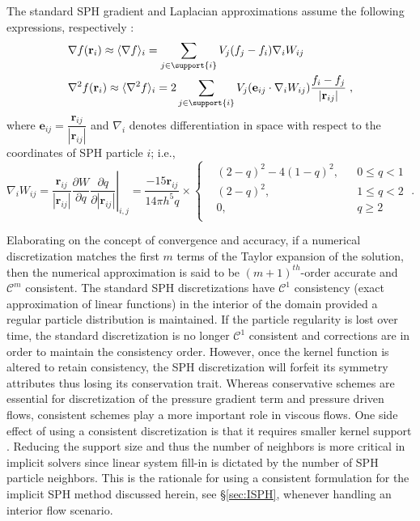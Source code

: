 The standard SPH gradient and Laplacian approximations assume the following expressions, respectively \cite{Monaghan2005a}:
\begin{align}
&\nabla f(\mathbf r_i) \approx \langle \nabla f \rangle_i=\sum_{j \in \support{i}} V_j (f_j-f_i) \nabla_i W_{ij}\label{eq:Standard_G}\\
&\nabla^2 f(\mathbf r_i) \approx \langle \nabla^2 f \rangle_i=2\sum_{j \in \support{i}} V_j ( \mathbf{e}_{ij} \cdot \nabla_i W_{ij}) \frac{f_i-f_j}{|\mathbf{r}_{ij}|} \; , \label{eq:Standard_L}
\end{align}
where $\mathbf{e}_{ij}=\dfrac{\mathbf{r}_{ij}}{|\mathbf{r}_{ij}|}$ and $\nabla_i$ denotes differentiation in space with respect to the coordinates of SPH particle $i$; i.e., 
\begin{equation}
\label{eq:nablaW}
\nabla_i W_{ij} =\left.\frac{\mathbf r_{ij}}{|\mathbf r_{ij}|} \frac{\partial W}{\partial q} \frac{\partial q}{\partial |\mathbf r_{ij}|}\right\vert_{i,j} =  \frac{-15{\mathbf r}_{ij}}{{14\pi {h^5}q}} \times \left\{ \begin{aligned}
&{(2 - q)^2} - 4{(1 - q)^2}, && 0 \le q < 1 \\ 
&(2 - q)^2, && 1 \le q < 2 \\ 
&0, && q \ge 2 \\ 
\end{aligned} \right.\; .
\end{equation}

Elaborating on the concept of convergence and accuracy, if a numerical discretization matches the first $m$ terms of the Taylor expansion of the solution, then the numerical approximation
is said to be $(m + 1)^{th}$-order accurate and $\mathcal{C}^m$ consistent. The standard SPH discretizations have $\mathcal{C}^1$  consistency (exact approximation of linear functions) in the interior of the domain provided a regular particle distribution is maintained. If the particle regularity is lost over time, the standard discretization is no longer $\mathcal{C}^1$ consistent and corrections are in order to maintain the consistency order. However, once the kernel function is altered to retain consistency, the SPH discretization will forfeit its symmetry attributes thus losing its conservation trait. Whereas conservative schemes are essential for discretization of the pressure gradient term and pressure driven flows, consistent schemes play a more important role in viscous flows. One side effect of using a consistent discretization is that it requires smaller kernel support \cite{Trask2015,islam2018consistency}. Reducing the support size and thus the number of neighbors is more critical in implicit solvers since linear system fill-in is dictated by the number of SPH particle neighbors. This is the rationale for using a consistent formulation for the implicit SPH method discussed herein, see \S\ref{sec:ISPH}, whenever handling an interior flow scenario.


